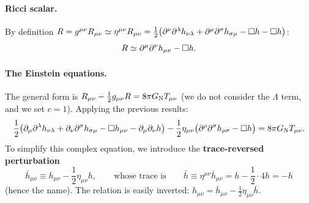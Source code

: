 \paragraph{Ricci scalar.} By definition $R=g^{\mu\nu}R_{\mu\nu}\simeq\eta^{\mu\nu}R_{\mu\nu}=\frac12\big(\partial^\nu\partial^\lambda h_{\nu\lambda}+\partial^\mu\partial^\sigma h_{\sigma\mu}-\square h-\square h\big)$:
\begin{equation}
  R\simeq\partial^\mu\partial^\nu h_{\mu\nu}-\square h .
\end{equation}

\paragraph{The Einstein equations.} The general form is $R_{\mu\nu}-\frac12g_{\mu\nu}R=8\pi G_{\mathrm N} T_{\mu\nu}$ (we do not consider the $\Lambda$ term, and we set $c=1$). Applying the previous results:
\begin{equation}
  \frac12\big(\partial_\mu\partial^\lambda h_{\nu\lambda}+\partial_\nu\partial^\sigma h_{\sigma\mu}-\square h_{\mu\nu}-\partial_\mu\partial_\nu h\big)-\frac12\eta_{\mu\nu}\big(\partial^\rho\partial^\sigma h_{\rho\sigma}-\square h\big)=8\pi G_{\mathrm N} T_{\mu\nu}.
  \label{eq:lin-efe-h}
\end{equation}
To simplify this complex equation, we introduce the \textbf{trace-reversed perturbation}
\begin{equation}
  \bar h_{\mu\nu}\equiv h_{\mu\nu}-\frac12\eta_{\mu\nu}h ,\qquad\text{whose trace is}\qquad\bar h\equiv\eta^{\mu\nu}\bar h_{\mu\nu}=h-\frac12\cdot4h=-h
\end{equation}
(hence the name). The relation is easily inverted: $h_{\mu\nu}=\bar h_{\mu\nu}-\frac12\eta_{\mu\nu}\bar h$.

